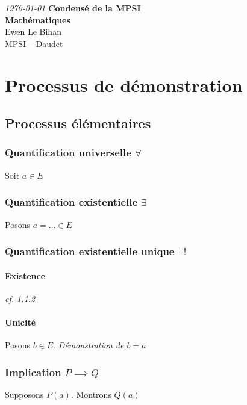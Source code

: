 \documentclass{article}
\begin{document}
\begin{titlepage}
	\begin{center}
		\textit{\today}
		\vfill
		\textbf{\LARGE{Condensé de la MPSI}\\\Large{Mathématiques}}\\
		\vfill
		\large{Ewen Le Bihan\\MPSI -- Daudet}
	\end{center}
\end{titlepage}

\newpage
\tableofcontents

\newpage
\section{Processus de démonstration}
\subsection{Processus élémentaires}
\subsubsection{Quantification universelle $\forall$}
\label{quantification_universelle}
Soit $a \in E$

\subsubsection{Quantification existentielle $\exists$}
\label{quantification_existentielle}
Posons $a = \ldots \in E$

\subsubsection{Quantification existentielle unique $\exists!$}
\paragraph{Existence}
\emph{cf. \ref{quantification_existentielle}} 

\paragraph{Unicité}
Posons $b \in E$.
\emph{Démonstration de $b = a$} 

\subsubsection{Implication $P \implies Q$}
\label{implication}
Supposons $P(a)$. Montrons $Q(a)$
\end{document}
